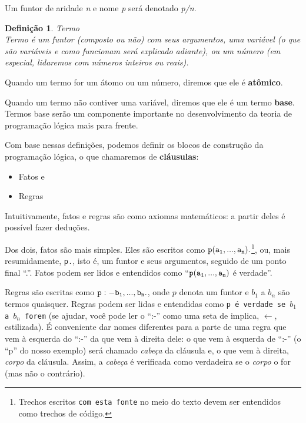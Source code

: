 \documentclass{article}
\newtheorem{definition}{Definição}[section]
\theoremstyle{remark}
\begin{document}
    Um funtor de aridade \textit{n} e nome \textit{p} será denotado \textit{p/n}.



  \theoremstyle{definition}
  \begin{definition}{Termo}
    \\Termo é um funtor (composto ou não) com seus argumentos, uma variável (o que são variáveis e como funcionam será explicado adiante), ou um número (em especial, lidaremos com números inteiros ou reais).
  \end{definition}

  Quando um termo for um átomo ou um número, diremos que ele é \textbf{atômico}.

Quando um termo não contiver uma variável, diremos que ele é um termo \textbf{base}.
Termos base serão um componente importante no desenvolvimento da teoria de programação lógica mais para frente.

Com base nessas definições, podemos definir os blocos de construção da programação lógica, o que chamaremos de \textbf{cláusulas}:
\begin{itemize}
  \item Fatos e
  \item Regras
\end{itemize}

Intuitivamente, fatos e regras são como axiomas matemáticos: a partir deles é possível fazer deduções.

Dos dois, fatos são mais simples. Eles são escritos como  ${\tt p(a_1, ..., a_n).}$\footnote{Trechos escritos {\tt com esta fonte} no meio do texto devem ser entendidos como trechos de código.},  ou, mais resumidamente, {\tt p.}, isto é, um funtor e seus argumentos, seguido de um ponto final ``.''. Fatos podem ser lidos e entendidos como ``${\tt p(a_1, ..., a_n)}$ é verdade''.

Regras são escritas como ${\tt p :- b_1, ..., b_n.}$, onde $p$ denota um funtor e $b_1$ a $b_n$ são termos quaisquer. Regras podem ser lidas e entendidas como {\tt p é verdade se $b_1$ a $b_n$ forem} (se ajudar, você pode ler o ``:-'' como uma seta de implica, $\leftarrow$, estilizada). É conveniente dar nomes diferentes para a parte de uma regra que vem à esquerda do ``:-'' da que vem à direita dele: o que vem à esquerda de ``:-'' (o ``p'' do nosso exemplo) será chamado \textit{cabeça} da cláusula e, o que vem à direita, \textit{corpo} da cláusula. Assim, a
\textit{cabeça} é verificada como verdadeira se o \textit{corpo} o for (mas não o contrário).
\end{document}
